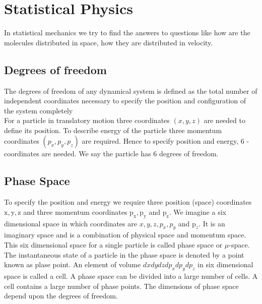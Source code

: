 \chapter{Statistical Physics}
\par In statistical mechanics we try to find the answers to questions like how are the molecules distributed in space, how they are distributed in velocity.
\section{Degrees of freedom}
The degrees of freedom of any dynamical system is defined as the total number of independent coordinates necessary to specify the position and configuration of the system completely\\
For a particle in translatory motion three coordinates $(x, y, z)$ are needed to define its position. To describe energy of the particle three momentum coordinates $\left(p_{x}, p_{y}, p_{z}\right)$ are required. Hence to specify position and energy, 6 -coordinates are needed. We say the particle has 6 degrees of freedom.
\section{Phase Space}
To specify the position and energy we require three position (space) coordinates $\mathrm{x}, \mathrm{y}, \mathrm{z}$ and three momentum coordinates $\mathrm{p}_{\mathrm{x}}, \mathrm{p}_{\mathrm{y}}$ and $\mathrm{p}_{\mathrm{z}}$. We imagine a six dimensional space in which coordinates are $x, y, z, p_{x}, p_{y}$ and $\mathrm{p}_{z}$. It is an imaginary space and is a combination of physical space and momentum space. This six dimensional space for a single particle is called phase space or $\mu$-space. The instantaneous state of a particle in the phase space is denoted by a point known as plase point. An element of volume $d x d y d z d p_{x} d p_{y} d p_{z}$ in six dimensional space is called a cell. A phase space can be divided into a large number of cells. A cell contains a large number of phase points. The dimensions of phase space depend upon the degrees of freedom.
